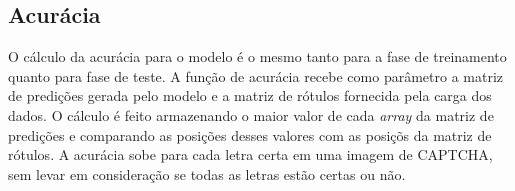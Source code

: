 \subsection{Acurácia}

O cálculo da acurácia para o modelo é o mesmo tanto para a fase de
treinamento quanto para fase de teste. A função de acurácia recebe
como parâmetro a matriz de predições gerada pelo modelo e a matriz de
rótulos fornecida pela carga dos dados. O cálculo é feito armazenando o
maior valor de cada \textit{array} da matriz de predições e comparando
as posições desses valores com as posiçõs da matriz de rótulos. A
acurácia sobe para cada letra certa em uma imagem de CAPTCHA, sem
levar em consideração se todas as letras estão certas ou não.

